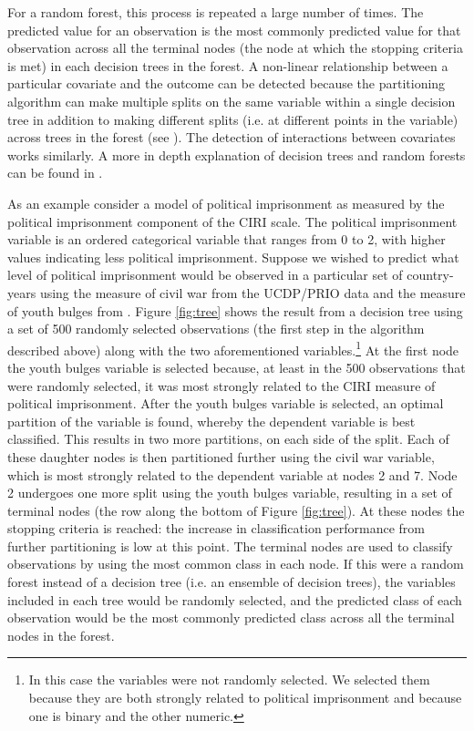 \documentclass[12pt]{article}
\begin{document}
For a random forest, this process is repeated a large number of times. The predicted value for an observation is the most commonly predicted value for that observation across all the terminal nodes (the node at which the stopping criteria is met) in each decision trees in the forest.
A non-linear relationship between a particular covariate and the outcome can be detected because the partitioning algorithm can make multiple splits on the same variable within a single decision tree in addition to making different splits (i.e. at different points in the variable) across trees in the forest (see \citet{biau2008consistency}). The detection of interactions between covariates works similarly. A more in depth explanation of decision trees and random forests can be found in \citet{strobl2009introduction}. 

As an example consider a model of political imprisonment as measured by the political imprisonment component of the CIRI scale. The political imprisonment variable is an ordered categorical variable that ranges from 0 to 2, with higher values indicating less political imprisonment. Suppose we wished to predict what level of political imprisonment would be observed in a particular set of country-years using the measure of civil war from the UCDP/PRIO data \citep{ThemnerWallensteen2012} and the measure of youth bulges from \citet{Urdal2006}. Figure \ref{fig:tree} shows the result from a decision tree using a set of 500 randomly selected observations (the first step in the algorithm described above) along with the two aforementioned variables.\footnote{In this case the variables were not randomly selected. We selected them because they are both strongly related to political imprisonment and because one is binary and the other numeric.} At the first node the youth bulges variable is selected because, at least in the 500 observations that were randomly selected, it was most strongly related to the CIRI measure of political imprisonment. After the youth bulges variable is selected, an optimal partition of the variable is found, whereby the dependent variable is best classified. This results in two more partitions, on each side of the split. Each of these daughter nodes is then partitioned further using the civil war variable, which is most strongly related to the dependent variable at nodes 2 and 7. Node 2 undergoes one more split using the youth bulges variable, resulting in a set of terminal nodes (the row along the bottom of Figure \ref{fig:tree}). At these nodes the stopping criteria is reached: the increase in classification performance from further partitioning is low at this point. The terminal nodes are used to classify observations by using the most common class in each node. If this were a random forest instead of a decision tree (i.e. an ensemble of decision trees), the variables included in each tree would be randomly selected, and the predicted class of each observation would be the most commonly predicted class across all the terminal nodes in the forest.
\end{document}
